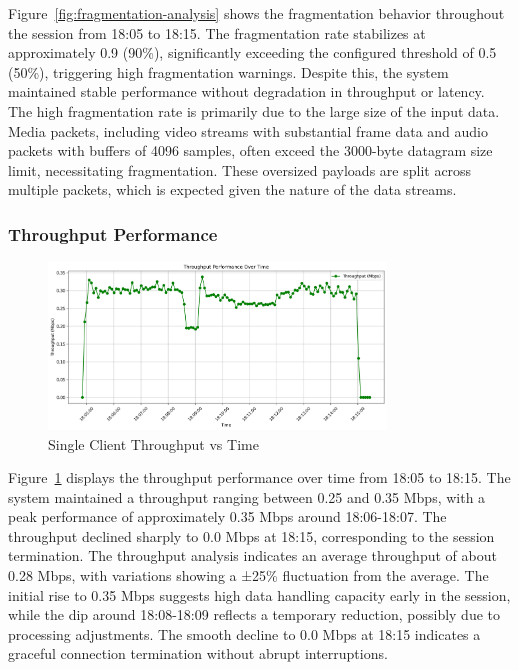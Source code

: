 Figure~\ref{fig:fragmentation-analysis} shows the fragmentation behavior throughout the session from 18:05 to 18:15. The fragmentation rate stabilizes at approximately 0.9 (90\%), significantly exceeding the configured threshold of 0.5 (50\%), triggering high fragmentation warnings. Despite this, the system maintained stable performance without degradation in throughput or latency.
The high fragmentation rate is primarily due to the large size of the input data. Media packets, including video streams with substantial frame data and audio packets with buffers of 4096 samples, often exceed the 3000-byte datagram size limit, necessitating fragmentation. These oversized payloads are split across multiple packets, which is expected given the nature of the data streams.



\subsubsection{Throughput Performance}

\begin{figure}[h!]
\centering
\includegraphics[width=0.8\textwidth]{Evaluation/single_throughput_performance.png}
\caption{Single Client Throughput vs Time}
\label{fig:single-throughput-performance}
\end{figure}

Figure~\ref{fig:single-throughput-performance} displays the throughput performance over time from 18:05 to 18:15. The system maintained a throughput ranging between 0.25 and 0.35 Mbps, with a peak performance of approximately 0.35 Mbps around 18:06-18:07. The throughput declined sharply to 0.0 Mbps at 18:15, corresponding to the session termination.
The throughput analysis indicates an average throughput of about 0.28 Mbps, with variations showing a ±25\% fluctuation from the average. The initial rise to 0.35 Mbps suggests high data handling capacity early in the session, while the dip around 18:08-18:09 reflects a temporary reduction, possibly due to processing adjustments. The smooth decline to 0.0 Mbps at 18:15 indicates a graceful connection termination without abrupt interruptions.


